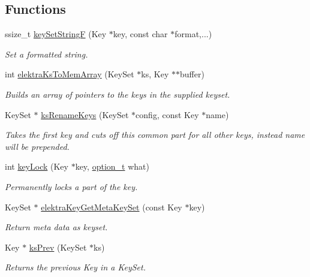 \subsection*{Functions}
\begin{DoxyCompactItemize}
\item 
ssize\+\_\+t \hyperlink{group__api_ga812eb6c4f506dafa5733bf531c52199c}{key\+Set\+String\+F} (Key $\ast$key, const char $\ast$format,...)
\begin{DoxyCompactList}\small\item\em Set a formatted string. \end{DoxyCompactList}\item 
int \hyperlink{group__api_gac3e995819383f904369c260f212125f5}{elektra\+Ks\+To\+Mem\+Array} (Key\+Set $\ast$ks, Key $\ast$$\ast$buffer)
\begin{DoxyCompactList}\small\item\em Builds an array of pointers to the keys in the supplied keyset. \end{DoxyCompactList}\item 
Key\+Set $\ast$ \hyperlink{group__api_ga7557d07db07649b9d81e6da63ce59376}{ks\+Rename\+Keys} (Key\+Set $\ast$config, const Key $\ast$name)
\begin{DoxyCompactList}\small\item\em Takes the first key and cuts off this common part for all other keys, instead name will be prepended. \end{DoxyCompactList}\item 
int \hyperlink{group__api_ga2dd8d2650e59a90e933c631267bfbb85}{key\+Lock} (Key $\ast$key, \hyperlink{group__keyset_ga98a3d6a4016c9dad9cbd1a99a9c2a45a}{option\+\_\+t} what)
\begin{DoxyCompactList}\small\item\em Permanently locks a part of the key. \end{DoxyCompactList}\item 
Key\+Set $\ast$ \hyperlink{group__api_ga48120f254e09e0c5cceff4864f110ceb}{elektra\+Key\+Get\+Meta\+Key\+Set} (const Key $\ast$key)
\begin{DoxyCompactList}\small\item\em Return meta data as keyset. \end{DoxyCompactList}\item 
Key $\ast$ \hyperlink{group__api_gae7d268f13dd89a6e126b3718b117996f}{ks\+Prev} (Key\+Set $\ast$ks)
\begin{DoxyCompactList}\small\item\em Returns the previous Key in a Key\+Set. \end{DoxyCompactList}\item 
$$
\end{DoxyCompactItemize}
